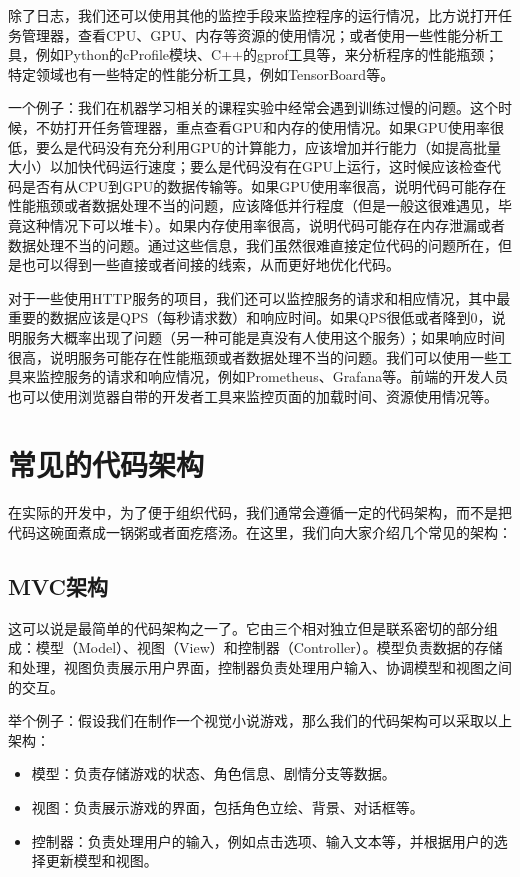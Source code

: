 \documentclass[../main.tex]{subfiles}
\begin{document}
除了日志，我们还可以使用其他的监控手段来监控程序的运行情况，比方说打开任务管理器，查看CPU、GPU、内存等资源的使用情况；或者使用一些性能分析工具，例如Python的cProfile模块、C++的gprof工具等，来分析程序的性能瓶颈；特定领域也有一些特定的性能分析工具，例如TensorBoard等。

一个例子：我们在机器学习相关的课程实验中经常会遇到训练过慢的问题。这个时候，不妨打开任务管理器，重点查看GPU和内存的使用情况。如果GPU使用率很低，要么是代码没有充分利用GPU的计算能力，应该增加并行能力（如提高批量大小）以加快代码运行速度；要么是代码没有在GPU上运行，这时候应该检查代码是否有从CPU到GPU的数据传输等。如果GPU使用率很高，说明代码可能存在性能瓶颈或者数据处理不当的问题，应该降低并行程度（但是一般这很难遇见，毕竟这种情况下可以堆卡）。如果内存使用率很高，说明代码可能存在内存泄漏或者数据处理不当的问题。通过这些信息，我们虽然很难直接定位代码的问题所在，但是也可以得到一些直接或者间接的线索，从而更好地优化代码。

对于一些使用HTTP服务的项目，我们还可以监控服务的请求和相应情况，其中最重要的数据应该是QPS（每秒请求数）和响应时间。如果QPS很低或者降到0，说明服务大概率出现了问题（另一种可能是真没有人使用这个服务）；如果响应时间很高，说明服务可能存在性能瓶颈或者数据处理不当的问题。我们可以使用一些工具来监控服务的请求和响应情况，例如Prometheus、Grafana等。前端的开发人员也可以使用浏览器自带的开发者工具来监控页面的加载时间、资源使用情况等。

\section{常见的代码架构}\label{sec:code-architecture}

在实际的开发中，为了便于组织代码，我们通常会遵循一定的代码架构，而不是把代码这碗面煮成一锅粥或者面疙瘩汤。在这里，我们向大家介绍几个常见的架构：

\subsection{MVC架构}

这可以说是最简单的代码架构之一了。它由三个相对独立但是联系密切的部分组成：模型（Model）、视图（View）和控制器（Controller）。模型负责数据的存储和处理，视图负责展示用户界面，控制器负责处理用户输入、协调模型和视图之间的交互。

举个例子：假设我们在制作一个视觉小说游戏，那么我们的代码架构可以采取以上架构：
\begin{itemize}
  \item 模型：负责存储游戏的状态、角色信息、剧情分支等数据。
  \item 视图：负责展示游戏的界面，包括角色立绘、背景、对话框等。
  \item 控制器：负责处理用户的输入，例如点击选项、输入文本等，并根据用户的选择更新模型和视图。
\end{itemize}
\end{document}
